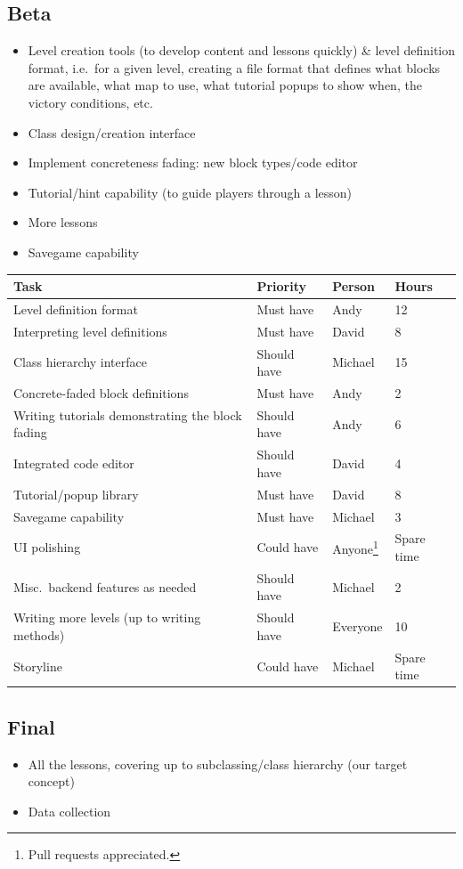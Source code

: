 \documentclass[12pt,notitlepage]{article}
\begin{document}
\subsection{Beta}

\begin{itemize}
\item Level creation tools (to develop content and lessons quickly) \&
  level definition format, i.e.\ for a given level, creating a file
  format that defines what blocks are available, what map to use, what
  tutorial popups to show when, the victory conditions, etc.
\item Class design/creation interface
\item Implement concreteness fading: new block types/code editor
\item Tutorial/hint capability (to guide players through a lesson)
\item More lessons
\item Savegame capability
\end{itemize}

\begin{tabu}{Xlll}
\toprule
Task & Priority & Person & Hours \\
\midrule
Level definition format & Must have & Andy & 12 \\
Interpreting level definitions & Must have & David & 8 \\
Class hierarchy interface & Should have & Michael & 15 \\
Concrete-faded block definitions & Must have & Andy & 2 \\
Writing tutorials demonstrating the block fading & Should have & Andy & 6 \\
Integrated code editor & Should have & David & 4 \\
Tutorial/popup library & Must have & David & 8 \\
Savegame capability & Must have & Michael & 3 \\
UI polishing & Could have & Anyone\footnote{Pull requests appreciated.}  & Spare time \\
Misc.\ backend features as needed & Should have & Michael & 2 \\
Writing more levels (up to writing methods) & Should have & Everyone & 10 \\
Storyline & Could have & Michael & Spare time \\
\bottomrule
\end{tabu}

\subsection{Final}
\begin{itemize}
\item All the lessons, covering up to subclassing/class hierarchy (our
  target concept)
\item Data collection
\end{itemize}
\end{document}
